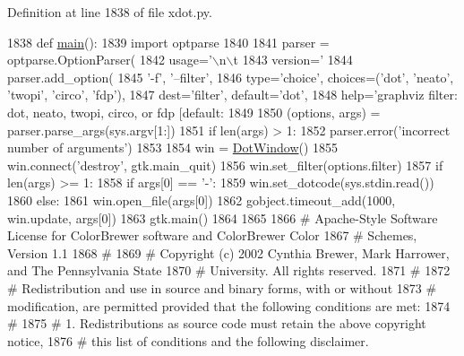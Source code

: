 Definition at line 1838 of file xdot.\+py.


\begin{DoxyCode}
1838 \textcolor{keyword}{def }\hyperlink{namespacesmacc__viewer_1_1xdot_1_1xdot_a1d6f97e5f27b256b6d6aa937f3d5d2fc}{main}():
1839     \textcolor{keyword}{import} optparse
1840 
1841     parser = optparse.OptionParser(
1842         usage=\textcolor{stringliteral}{'\(\backslash\)n\(\backslash\)t%
1843         version=\textcolor{stringliteral}{'%
1844     parser.add\_option(
1845         \textcolor{stringliteral}{'-f'}, \textcolor{stringliteral}{'--filter'},
1846         type=\textcolor{stringliteral}{'choice'}, choices=(\textcolor{stringliteral}{'dot'}, \textcolor{stringliteral}{'neato'}, \textcolor{stringliteral}{'twopi'}, \textcolor{stringliteral}{'circo'}, \textcolor{stringliteral}{'fdp'}),
1847         dest=\textcolor{stringliteral}{'filter'}, default=\textcolor{stringliteral}{'dot'},
1848         help=\textcolor{stringliteral}{'graphviz filter: dot, neato, twopi, circo, or fdp [default: %
1849 
1850     (options, args) = parser.parse\_args(sys.argv[1:])
1851     \textcolor{keywordflow}{if} len(args) > 1:
1852         parser.error(\textcolor{stringliteral}{'incorrect number of arguments'})
1853 
1854     win = \hyperlink{classsmacc__viewer_1_1xdot_1_1xdot_1_1DotWindow}{DotWindow}()
1855     win.connect(\textcolor{stringliteral}{'destroy'}, gtk.main\_quit)
1856     win.set\_filter(options.filter)
1857     \textcolor{keywordflow}{if} len(args) >= 1:
1858         \textcolor{keywordflow}{if} args[0] == \textcolor{stringliteral}{'-'}:
1859             win.set\_dotcode(sys.stdin.read())
1860         \textcolor{keywordflow}{else}:
1861             win.open\_file(args[0])
1862             gobject.timeout\_add(1000, win.update, args[0])
1863     gtk.main()
1864 
1865 
1866 \textcolor{comment}{# Apache-Style Software License for ColorBrewer software and ColorBrewer Color}
1867 \textcolor{comment}{# Schemes, Version 1.1}
1868 \textcolor{comment}{# }
1869 \textcolor{comment}{# Copyright (c) 2002 Cynthia Brewer, Mark Harrower, and The Pennsylvania State}
1870 \textcolor{comment}{# University. All rights reserved.}
1871 \textcolor{comment}{# }
1872 \textcolor{comment}{# Redistribution and use in source and binary forms, with or without}
1873 \textcolor{comment}{# modification, are permitted provided that the following conditions are met:}
1874 \textcolor{comment}{# }
1875 \textcolor{comment}{#    1. Redistributions as source code must retain the above copyright notice,}
1876 \textcolor{comment}{#    this list of conditions and the following disclaimer.  }
}}}
\end{DoxyCode}
